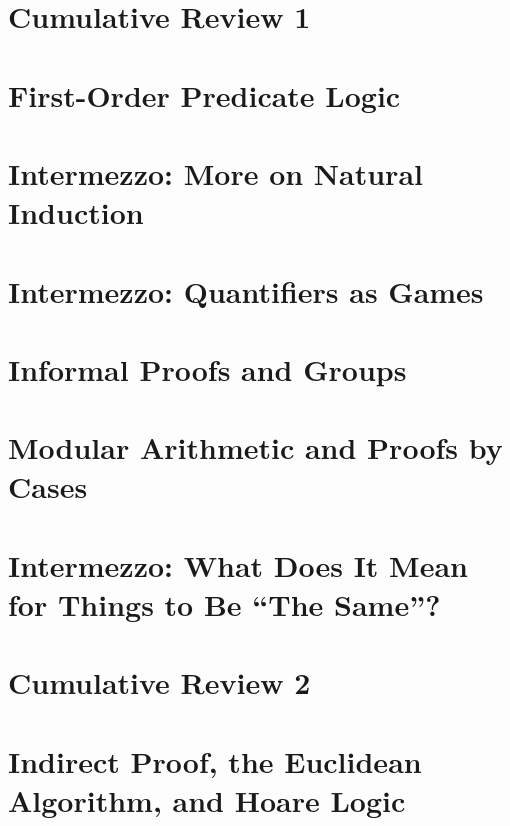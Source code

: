 \documentclass[11pt]{report}
\begin{document}
\chapter*{Cumulative Review 1}


\chapter{First-Order Predicate Logic}


\chapter*{Intermezzo: More on Natural Induction}


\chapter*{Intermezzo: Quantifiers as Games}


\chapter{Informal Proofs and Groups}


\chapter{Modular Arithmetic and Proofs by Cases}


\chapter*{Intermezzo: What Does It Mean for Things to Be ``The Same''?}


\chapter*{Cumulative Review 2}


\chapter{Indirect Proof, the Euclidean Algorithm, and Hoare Logic}

\end{document}
